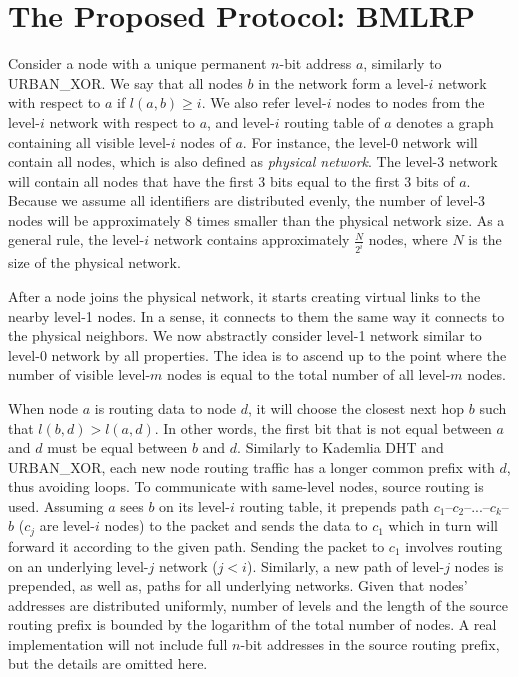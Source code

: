 \documentclass[conference]{IEEEtran}
\theoremstyle{definition}
\newcommand{\urbanxor}{URBAN\_XOR}
\begin{document}
\section{The Proposed Protocol:  BMLRP}
\label{sec:bmlrp}

Consider a node with a unique permanent $n$-bit address $a$, similarly to \urbanxor. We say that all nodes $b$ in the network form a level-$i$ network with respect to $a$ if $l(a,b) \ge i$. We also refer level-$i$ nodes to nodes from the level-$i$ network with respect to $a$, and level-$i$ routing table of $a$ denotes a graph containing all visible level-$i$ nodes of $a$. For instance, the level-0 network will contain all nodes, which is also defined as \emph{physical network}. The level-3 network will contain all nodes that have the first 3 bits equal to the first 3 bits of $a$. Because we assume all identifiers are distributed evenly, the number of level-3 nodes will be approximately 8 times smaller than the physical network size. As a general rule, the level-$i$ network contains approximately $\frac{N}{2^i}$ nodes, where $N$ is the size of the physical network.

After a node joins the physical network, it starts creating virtual links to the nearby level-1 nodes. In a sense, it connects to them the same way it connects to the physical neighbors. We now abstractly consider level-1 network similar to level-0 network by all properties. The idea is to ascend up to the point where the number of visible level-$m$ nodes is equal to the total number of all level-$m$ nodes. 



When node $a$ is routing data to node $d$, it will choose the closest next hop $b$ such that $l(b,d) > l(a,d)$. In other words, the first bit that is not equal between $a$ and $d$ must be equal between $b$ and $d$. Similarly to Kademlia DHT and \urbanxor, each new node routing traffic has a longer common prefix with $d$, thus avoiding loops. To communicate with same-level nodes, source routing is used. Assuming $a$ sees $b$ on its level-$i$ routing table, it prepends path $c_1$--$c_2$--...--$c_k$--$b$ ($c_j$ are level-$i$ nodes) to the packet and sends the data to $c_1$ which in turn will forward it according to the given path. Sending the packet to $c_1$ involves routing on an underlying level-$j$ network ($j < i$). Similarly, a new path of level-$j$ nodes is prepended, as well as, paths for all underlying networks. Given that nodes' addresses are distributed uniformly, number of levels and the length of the source routing prefix is bounded by the logarithm of the total number of nodes. A real implementation will not include full $n$-bit addresses in the source routing prefix, but the details are omitted here.
\end{document}
